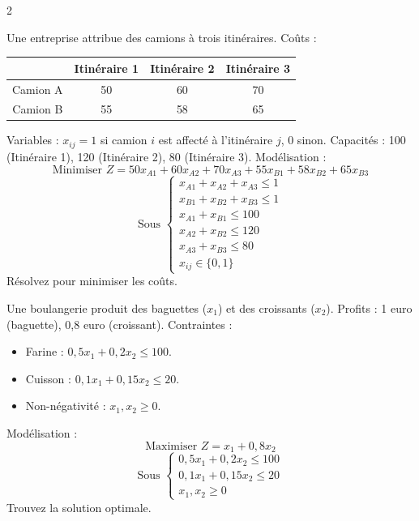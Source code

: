 \begin{multicols}{2}
\begin{exo}
	Une entreprise attribue des camions à trois itinéraires. Coûts :
	\begin{center}
		\begin{tabular}{c|ccc}
			& Itinéraire 1 & Itinéraire 2 & Itinéraire 3 \\
			\hline
			Camion A & 50 & 60 & 70 \\
			Camion B & 55 & 58 & 65 \\
		\end{tabular}
	\end{center}
	Variables : \(x_{ij} = 1\) si camion \(i\) est affecté à l'itinéraire \(j\), 0 sinon. Capacités : 100 (Itinéraire 1), 120 (Itinéraire 2), 80 (Itinéraire 3).
	Modélisation :
	\[
	\text{Minimiser } Z = 50x_{A1} + 60x_{A2} + 70x_{A3} + 55x_{B1} + 58x_{B2} + 65x_{B3}
	\]
	\[
	\text{Sous } \begin{cases}
	x_{A1} + x_{A2} + x_{A3} \leq 1 \\
	x_{B1} + x_{B2} + x_{B3} \leq 1 \\
	x_{A1} + x_{B1} \leq 100 \\
	x_{A2} + x_{B2} \leq 120 \\
	x_{A3} + x_{B3} \leq 80 \\
	x_{ij} \in \{0,1\}
	\end{cases}
	\]
	Résolvez pour minimiser les coûts.
\end{exo}

\begin{exo}
	Une boulangerie produit des baguettes (\(x_1\)) et des croissants (\(x_2\)). Profits : 1 euro (baguette), 0,8 euro (croissant). Contraintes :
	\begin{itemize}
		\item Farine : \(0,5x_1 + 0,2x_2 \leq 100\).
		\item Cuisson : \(0,1x_1 + 0,15x_2 \leq 20\).
		\item Non-négativité : \(x_1, x_2 \geq 0\).
	\end{itemize}
	Modélisation :
	\[
	\text{Maximiser } Z = x_1 + 0,8x_2
	\]
	\[
	\text{Sous } \begin{cases}
	0,5x_1 + 0,2x_2 \leq 100 \\
	0,1x_1 + 0,15x_2 \leq 20 \\
	x_1, x_2 \geq 0
	\end{cases}
	\]
	Trouvez la solution optimale.
\end{exo}


\end{multicols}
